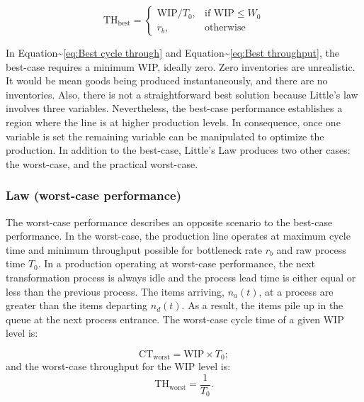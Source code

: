 \documentclass{article}
\begin{document}
\begin{equation}\label{eq:Best throughput}
    \mbox{TH}_{\mbox{best}}=
    \begin{cases}
 \mbox{WIP}/T_0,  & \mbox{if }\mbox{WIP} \le W_0\\
  r_b, & \mbox{otherwise }
    \end{cases}
\end{equation}

In Equation\textasciitilde{}\ref{eq:Best cycle through} and Equation\textasciitilde{}\ref{eq:Best throughput}, the best-case requires a minimum WIP, ideally zero.
Zero inventories are unrealistic.
It would be mean goods being produced instantaneously, and there are no inventories.
Also, there is not a straightforward best solution because Little's law involves three variables.
Nevertheless, the best-case performance establishes a region where the line is at higher production levels.
In consequence, once one variable is set the remaining variable can be manipulated to optimize the production.
In addition to the best-case, Little's Law produces two other cases: the worst-case, and the practical worst-case.

\subsubsection{Law (worst-case performance)}
\label{sec:orgaa19f27}

The worst-case performance describes an opposite scenario to the best-case performance.
In the worst-case, the production line operates at maximum cycle time and minimum throughput possible for bottleneck rate \(r_b\) and raw process time \(T_0\).
In a production operating at worst-case performance, the next transformation process is always idle and the process lead time is either equal or less than the previous process.
The items arriving, \(n_a(t)\), at a process are greater than the items departing \(n_d(t)\).
As a result, the items pile up in the queue at the next process entrance.
The worst-case cycle time of a given WIP level is:

\begin{equation}\label{eq:Worst-case performance cycle through}
    \mbox{CT}_{\mbox{worst}} = \mbox{WIP} \times T_0;
\end{equation}
\nolinebreak
and the worst-case throughput for the WIP level is:
\begin{equation}\label{eq:Worst-case performance throughput}
    \mbox{TH}_{\mbox{worst}} = \frac{1}{T_0}.
\end{equation}
\end{document}
